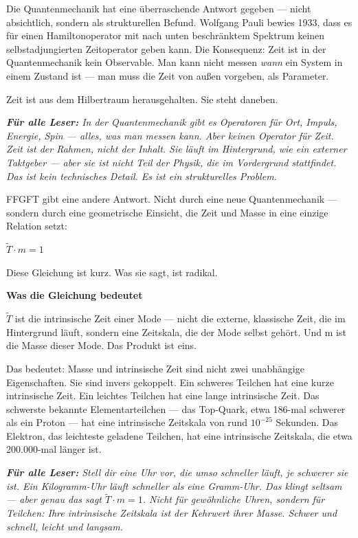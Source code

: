 \documentclass[11pt,oneside]{book}
\newenvironment{laierspur}{%
  \par\vspace{4pt}%
  \noindent\small\itshape\color{blue!60!black}%
  \textbf{Für alle Leser:}\enspace\ignorespaces}{%
  \par\vspace{4pt}\normalsize\normalfont\normalcolor}
\begin{document}
Die Quantenmechanik hat eine überraschende Antwort gegeben — nicht
absichtlich, sondern als strukturellen Befund. Wolfgang Pauli bewies 1933,
dass es für einen Hamiltonoperator mit nach unten beschränktem Spektrum
keinen selbstadjungierten Zeitoperator geben kann. Die Konsequenz: Zeit
ist in der Quantenmechanik kein Observable. Man kann nicht messen \textit{wann}
ein System in einem Zustand ist — man muss die Zeit von außen vorgeben,
als Parameter.


Zeit ist aus dem Hilbertraum herausgehalten. Sie steht daneben.


\begin{laierspur}
In der Quantenmechanik gibt es Operatoren für Ort, Impuls,
Energie, Spin — alles, was man messen kann. Aber keinen Operator für
Zeit. Zeit ist der Rahmen, nicht der Inhalt. Sie läuft im Hintergrund,
wie ein externer Taktgeber — aber sie ist nicht Teil der Physik, die im
Vordergrund stattfindet. Das ist kein technisches Detail. Es ist ein
strukturelles Problem.
\end{laierspur}

FFGFT gibt eine andere Antwort. Nicht durch eine neue Quantenmechanik —
sondern durch eine geometrische Einsicht, die Zeit und Masse in eine
einzige Relation setzt:


\textbf{$\tilde{T}\cdot m = 1$}


Diese Gleichung ist kurz. Was sie sagt, ist radikal.


\textbf{Was die Gleichung bedeutet}


$\tilde{T}$ ist die intrinsische Zeit einer Mode — nicht die externe, klassische
Zeit, die im Hintergrund läuft, sondern eine Zeitskala, die der Mode
selbst gehört. Und m ist die Masse dieser Mode. Das Produkt ist eins.


Das bedeutet: Masse und intrinsische Zeit sind nicht zwei unabhängige
Eigenschaften. Sie sind invers gekoppelt. Ein schweres Teilchen hat eine
kurze intrinsische Zeit. Ein leichtes Teilchen hat eine lange intrinsische
Zeit. Das schwerste bekannte Elementarteilchen — das Top-Quark, etwa
186-mal schwerer als ein Proton — hat eine intrinsische Zeitskala von
rund $10^{-25}$ Sekunden. Das Elektron, das leichteste geladene Teilchen,
hat eine intrinsische Zeitskala, die etwa 200.000-mal länger ist.


\begin{laierspur}
Stell dir eine Uhr vor, die umso schneller läuft, je schwerer
sie ist. Ein Kilogramm-Uhr läuft schneller als eine Gramm-Uhr. Das klingt
seltsam — aber genau das sagt $\tilde{T}\cdot m = 1$. Nicht für gewöhnliche Uhren,
sondern für Teilchen: Ihre intrinsische Zeitskala ist der Kehrwert ihrer
Masse. Schwer und schnell, leicht und langsam.
\end{laierspur}
\end{document}
